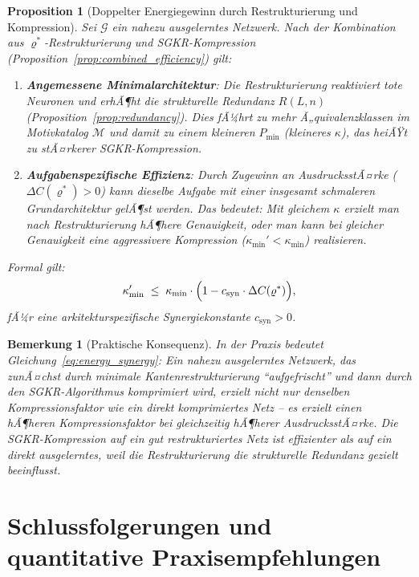 ﻿\documentclass[12pt, a4paper, openany]{report}
\newtheorem{proposition}[theorem]{Proposition}
\newtheorem{remark}[theorem]{Bemerkung}
\newcommand{\calG}{\mathcal{G}}
\newcommand{\calM}{\mathcal{M}}
\begin{document}
\begin{proposition}[Doppelter Energiegewinn durch Restrukturierung und Kompression]
\label{prop:energy_synergy}
Sei $\calG$ ein nahezu ausgelerntes Netzwerk.  Nach der Kombination aus
$\varrho^*$-Restrukturierung und SGKR-Kompression
(Proposition~\ref{prop:combined_efficiency}) gilt:
\begin{enumerate}[label=(\roman*)]
  \item \textbf{Angemessene Minimalarchitektur}: Die Restrukturierung
    reaktiviert tote Neuronen und erhÃ¶ht die strukturelle Redundanz $R(L,n)$
    (Proposition~\ref{prop:redundancy}).  Dies fÃ¼hrt zu mehr
    Ã„quivalenzklassen im Motivkatalog $\calM$ und damit zu einem
    kleineren $P_{\min}$ (kleineres $\kappa$), das heiÃŸt zu
    \emph{stÃ¤rkerer SGKR-Kompression}.
  \item \textbf{Aufgabenspezifische Effizienz}: Durch Zugewinn an
    AusdrucksstÃ¤rke ($\Delta C(\varrho^*) > 0$) kann dieselbe Aufgabe mit
    einer insgesamt schmaleren Grundarchitektur gelÃ¶st werden.  Das bedeutet:
    Mit gleichem $\kappa$ erzielt man nach Restrukturierung hÃ¶here
    Genauigkeit, oder man kann bei gleicher Genauigkeit eine aggressivere
    Kompression ($\kappa_{\min}' < \kappa_{\min}$) realisieren.
\end{enumerate}
Formal gilt:
\begin{equation}
  \label{eq:energy_synergy}
  \kappa'_{\min}
  \;\leq\;
  \kappa_{\min} \cdot
  \Bigl(1 - c_{\mathrm{syn}} \cdot \Delta C(\varrho^*)\Bigr),
\end{equation}
fÃ¼r eine arkitekturspezifische Synergiekonstante $c_{\mathrm{syn}} > 0$.
\end{proposition}

\begin{remark}[Praktische Konsequenz]
\label{rem:practical_energy}
In der Praxis bedeutet Gleichung~\eqref{eq:energy_synergy}: Ein nahezu
ausgelerntes Netzwerk, das zunÃ¤chst durch minimale Kantenrestrukturierung
``aufgefrischt'' und dann durch den SGKR-Algorithmus komprimiert wird,
erzielt nicht nur denselben Kompressionsfaktor wie ein direkt komprimiertes
Netz -- es erzielt einen \emph{hÃ¶heren} Kompressionsfaktor bei
gleichzeitig \emph{hÃ¶herer} AusdrucksstÃ¤rke.  Die SGKR-Kompression auf ein
gut restrukturiertes Netz ist effizienter als auf ein direkt ausgelerntes,
weil die Restrukturierung die strukturelle Redundanz gezielt beeinflusst.
\end{remark}

\section{Schlussfolgerungen und quantitative Praxisempfehlungen}
\label{sec:energy_conclusions}
\end{document}
